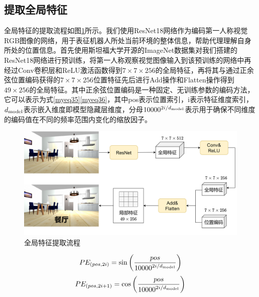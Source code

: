 \subsection{提取全局特征}
全局特征的提取流程如图\ref{全局特征提取}所示。我们使用ResNet18网络作为编码第一人称视觉RGB图像的网络，用于表征机器人所处当前环境的整体信息，帮助代理理解自身所处的位置信息。首先使用斯坦福大学开源的ImageNet数据集对我们搭建的ResNet18网络进行预训练，将第一人称观察视觉图像输入到该预训练的网络中再经过Conv卷积层和ReLU激活函数得到$7 \times 7 \times 256$的全局特征，再将其与通过正余弦位置编码获得的$7 \times 7 \times 256$位置特征先后进行Add操作和Flatten操作得到$49 \times 256$的全局特征。其中正余弦位置编码是一种固定、无训练参数的编码方法，它可以表示为式\ref{myeq35}\ref{myeq36}，其中pos表示位置索引，i表示特征维度索引，$d_{{\rm{model}}}$表示嵌入维度即模型隐藏层维度，分母${10000^{{{2i} \mathord{\left/
 {\vphantom {{2i} {{d_{{\rm{model}}}}}}} \right.
 \kern-\nulldelimiterspace} {{d_{{\rm{model}}}}}}}}$表示用于确保不同维度的编码值在不同的频率范围内变化的缩放因子。
\begin{figure}[htbp]
    \centering
    \includegraphics[scale=0.10]{Fig/全局特征提取.png}
    \caption{\label{全局特征提取}全局特征提取流程}
\end{figure}

\begin{equation}
    P{E_{\left( {pos,2i} \right)}} = \sin \left( {\frac{{pos}}{{{{10000}^{{{2i} \mathord{\left/
 {\vphantom {{2i} {{d_{{\rm{model}}}}}}} \right.
 \kern-\nulldelimiterspace} {{d_{{\rm{model}}}}}}}}}}} \right)
    \label{myeq35}
\end{equation}
\begin{equation}
    P{E_{\left( {pos,2i + 1} \right)}} = \cos \left( {\frac{{pos}}{{{{10000}^{{{2i} \mathord{\left/
 {\vphantom {{2i} {{d_{{\rm{model}}}}}}} \right.
 \kern-\nulldelimiterspace} {{d_{{\rm{model}}}}}}}}}}} \right)
    \label{myeq36}
\end{equation}

